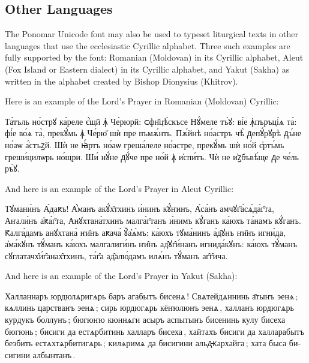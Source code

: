 \subsection{Other Languages}
The Ponomar Unicode font may also be used to typeset liturgical texts in other languages that use the ecclesiastic Cyrillic alphabet. Three such examples
are fully supported by the font: Romanian (Moldovan) in its Cyrillic alphabet, Aleut (Fox Island or Eastern dialect) in its Cyrillic alphabet, and Yakut (Sakha) as written in the alphabet created by Bishop Dionysius (Khitrov).

Here is an example of the Lord's Prayer in Romanian (Moldovan) Cyrillic: \\

\begin{russian}
{\glyphfont \large 
Та́тъль но́стрꙋ ка́реле є҆́щй ꙟ҆ Че́рюрй: ᲃ︀фн҃цѣ́скъсе Нꙋ́меле тъ́ꙋ: ві́е ꙟ҆пъръці́ѧ та̀: фі́е во́ѧ та̀, прекꙋ́мь ꙟ҆ Че́рю̆ шѝ пре пъмѫ́нть. Пѫ́йнѣ но́астръ чѣ̀ ᲁепꙋ́рꙋрѣ ᲁъ́не но́аѡ а҆́стъꙁй. Шѝ не ꙗ҆́ртъ но́аѡ греша́леле но́астре, прекꙋ́мь шѝ но́й є҆ртъ́мь греши́цилѡрь но́щри. Ши́ нꙋ́не ᲁꙋ́че пре но́й ꙟ҆ и҆спи́тъ. Чѝ не и҆ꙁбъвѣ́ще ᲁе че́ль ръ́ꙋ. 
} \\
\end{russian}

And here is an example of the Lord's Prayer in Aleut Cyrillic: \\

\begin{russian}
{\glyphfont \large
Тꙋмани́нъ А́даԟъ! А҆́манъ акꙋ́х̑тхинъ и́нинъ кꙋ́ҥинъ, А́са́нъ амчꙋг̑а́сѧ́да́г̑та, Аҥали́нъ а҆ԟа́г̑та, Анꙋхтана́тхинъ малга́г̑танъ и́нимъ кꙋ́ганъ ка́юхъ та́намъ кꙋ́ганъ. Ԟалга́дамъ анꙋхтана̀ ҥи̑нъ аԟача́ ꙋ̆а҆ѧ́мъ: ка́юхъ тꙋма́нинъ а́д̑ꙋнъ ҥи̑нъ игни́да, а҆ма́кꙋнъ тꙋ́манъ ка́юхъ малгалиги́нъ ҥи̑нъ ад̑ꙋг̑и́нанъ игнида́кꙋнъ: ка́юхъ тꙋ́манъ сꙋглатачх̑и́г̑анах̑тхинъ, та́г̑а ад̑алю́дамъ илѧ́нъ тꙋ́манъ аг̑г̑ича.
} \\
\end{russian}

And here is an example of the Lord's Prayer in Yakut (Sakha): \\

\begin{russian}
{\glyphfont \large
Халланнаръ юрдюлѧригѧрь баръ агабытъ бисенѧ ! Свѧтейдѧннинь а̄тыҥъ эенѧ ; кѧллинь царстваҥъ эенѧ ; сирь юрдюгѧрь кёҥюлюҥь эенѧ , халланъ юрдюгѧрь курдукъ боллунъ ; бюгюҥю кюннѧги асыръ аспытынъ бисенинь кулу бисеха бюгюнь ; бисиги да естѧрбитинь халларъ бисеха , хайтахъ бисиги да халларабытъ беэбить естѧхтѧрбитигѧрь ; килѧримѧ да бисигини альԫархайга ; хата быса бисигини албынтанъ .
}
\end{russian}
